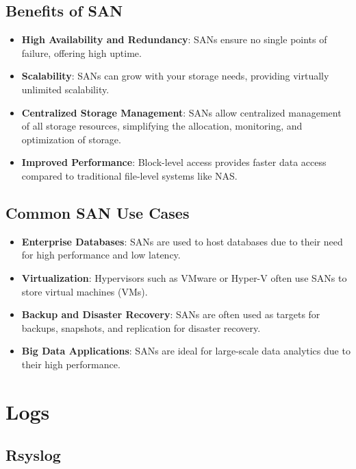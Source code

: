 \documentclass{article}
\begin{document}
\subsection{Benefits of SAN}
\begin{itemize}
    \item \textbf{High Availability and Redundancy}: SANs ensure no single points of failure, offering high uptime.
    \item \textbf{Scalability}: SANs can grow with your storage needs, providing virtually unlimited scalability.
    \item \textbf{Centralized Storage Management}: SANs allow centralized management of all storage resources, simplifying the allocation, monitoring, and optimization of storage.
    \item \textbf{Improved Performance}: Block-level access provides faster data access compared to traditional file-level systems like NAS.
\end{itemize}

\subsection{Common SAN Use Cases}
\begin{itemize}
    \item \textbf{Enterprise Databases}: SANs are used to host databases due to their need for high performance and low latency.
    \item \textbf{Virtualization}: Hypervisors such as VMware or Hyper-V often use SANs to store virtual machines (VMs).
    \item \textbf{Backup and Disaster Recovery}: SANs are often used as targets for backups, snapshots, and replication for disaster recovery.
    \item \textbf{Big Data Applications}: SANs are ideal for large-scale data analytics due to their high performance.
\end{itemize}

\newpage
\section{Logs}
\subsection{Rsyslog}
\end{document}
